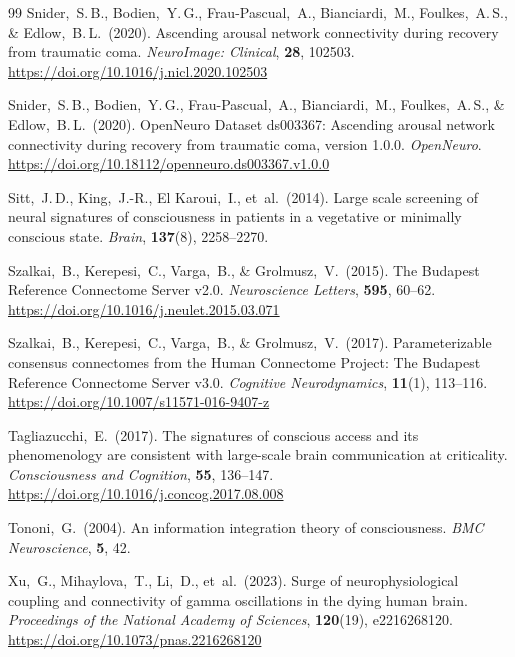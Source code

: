 \documentclass[11pt,a4paper]{article}
\theoremstyle{plain}
\theoremstyle{definition}
\theoremstyle{remark}
\begin{document}
\begin{thebibliography}{99}
Snider,~S.\,B., Bodien,~Y.\,G., Frau-Pascual,~A., Bianciardi,~M., Foulkes,~A.\,S., \& Edlow,~B.\,L.\ (2020).
Ascending arousal network connectivity during recovery from traumatic coma.
\textit{NeuroImage: Clinical}, \textbf{28}, 102503.
\url{https://doi.org/10.1016/j.nicl.2020.102503}

Snider,~S.\,B., Bodien,~Y.\,G., Frau-Pascual,~A., Bianciardi,~M., Foulkes,~A.\,S., \& Edlow,~B.\,L.\ (2020).
OpenNeuro Dataset ds003367: Ascending arousal network connectivity during recovery from traumatic coma, version 1.0.0.
\textit{OpenNeuro}.
\url{https://doi.org/10.18112/openneuro.ds003367.v1.0.0}

Sitt,~J.\,D., King,~J.-R., El Karoui,~I., et~al.\ (2014).
Large scale screening of neural signatures of consciousness in patients in a vegetative or minimally conscious state.
\textit{Brain}, \textbf{137}(8), 2258--2270.

Szalkai,~B., Kerepesi,~C., Varga,~B., \& Grolmusz,~V.\ (2015).
The Budapest Reference Connectome Server v2.0.
\textit{Neuroscience Letters}, \textbf{595}, 60--62.
\url{https://doi.org/10.1016/j.neulet.2015.03.071}

Szalkai,~B., Kerepesi,~C., Varga,~B., \& Grolmusz,~V.\ (2017).
Parameterizable consensus connectomes from the Human Connectome Project: The Budapest Reference Connectome Server v3.0.
\textit{Cognitive Neurodynamics}, \textbf{11}(1), 113--116.
\url{https://doi.org/10.1007/s11571-016-9407-z}

Tagliazucchi,~E.\ (2017).
The signatures of conscious access and its phenomenology are consistent with large-scale brain communication at criticality.
\textit{Consciousness and Cognition}, \textbf{55}, 136--147.
\url{https://doi.org/10.1016/j.concog.2017.08.008}

Tononi,~G.\ (2004).
An information integration theory of consciousness.
\textit{BMC Neuroscience}, \textbf{5}, 42.

Xu,~G., Mihaylova,~T., Li,~D., et~al.\ (2023).
Surge of neurophysiological coupling and connectivity of gamma oscillations in the dying human brain.
\textit{Proceedings of the National Academy of Sciences}, \textbf{120}(19), e2216268120.
\url{https://doi.org/10.1073/pnas.2216268120}

\end{thebibliography}
\end{document}
